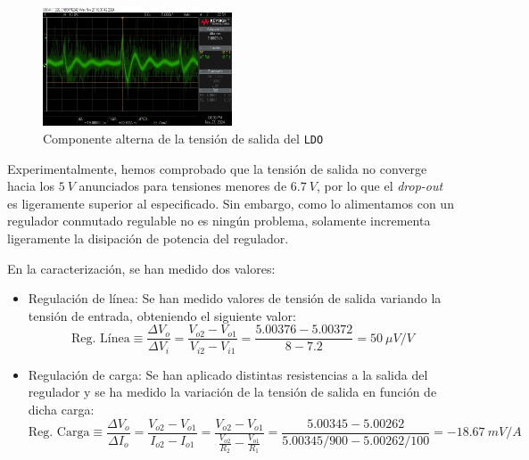 \begin{figure}[H]
    \centering
    \includegraphics[width=0.5\textwidth]{images/2-hardware/componentes/ldo/picosConLDO.jpg}
    \caption{Componente alterna de la tensión de salida del \texttt{LDO}}
    \label{fig:hardware/modulos/ldo-sin-picos}
\end{figure}

Experimentalmente, hemos comprobado que la tensión de salida no converge hacia los $5\ V$ anunciados para tensiones menores de $6.7\ V$, por lo que el \textit{drop-out} es ligeramente superior al especificado. Sin embargo, como lo alimentamos con un regulador conmutado regulable no es ningún problema, solamente incrementa ligeramente la disipación de potencia del regulador.

En la caracterización, se han medido dos valores: \begin{itemize}
    \item Regulación de línea: Se han medido valores de tensión de salida variando la tensión de entrada, obteniendo el siguiente valor: \[ \text{Reg. Línea} \equiv \frac{\Delta V_o}{\Delta V_i} = \frac{V_{o2} - V_{o1}}{V_{i2} - V_{i1}} = \frac{5.00376 - 5.00372}{8 - 7.2} = 50\ \mu V/V \]

    \item Regulación de carga: Se han aplicado distintas resistencias a la salida del regulador y se ha medido la variación de la tensión de salida en función de dicha carga: \[ \text{Reg. Carga} \equiv \frac{\Delta V_o}{\Delta I_o} = \frac{V_{o2} - V_{o1}}{I_{o2} - I_{o1}} = \frac{V_{o2} - V_{o1}}{\frac{V_{o2}}{R_2} - \frac{V_{o1}}{R_1}} = \frac{5.00345 - 5.00262}{5.00345/900 - 5.00262/100} = -18.67\ mV/A \]
\end{itemize}